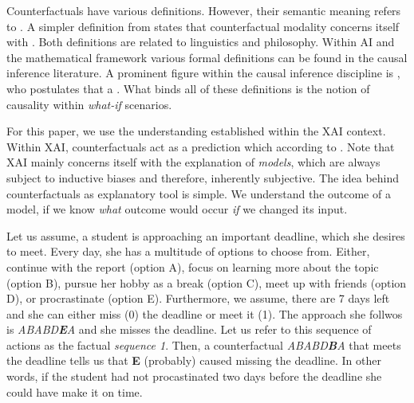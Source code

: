 \documentclass[./../../paper.tex]{subfiles}
\begin{document}
Counterfactuals have various definitions. However, their semantic meaning refers to \autocite{_counterfactual_}. A simpler definition from \citeauthor{starr_Counterfactuals_2021} states that counterfactual modality concerns itself with .
Both definitions are related to linguistics and philosophy. Within AI and the mathematical framework various formal definitions can be found in the causal inference\autocite{hitchcock_CausalModels_2020} literature. A prominent figure within the causal inference discipline is \citeauthor{pearl_Causalinferencestatistics_2016}, who postulates that a \autocite{pearl_Causalinferencestatistics_2016}. What binds all of these definitions is the notion of causality within \emph{what-if} scenarios.

For this paper, we use the understanding established within the \gls{XAI} context. Within \gls{XAI}, counterfactuals act as a prediction which  according to \citeauthor{molnar2019}\autocite[p. 212]{molnar2019}. Note that \gls{XAI} mainly concerns itself with the explanation of \emph{models}, which are always subject to inductive biases and therefore, inherently subjective. The idea behind counterfactuals as explanatory tool\footnotemark{} is simple. We understand the outcome of a model, if we know \emph{what} outcome would occur \emph{if} we changed its input. 

Let us assume, a student is approaching an important deadline, which she desires to meet. Every day, she has a multitude of options to choose from. Either, continue with the report (option A), focus on learning more about the topic (option B), pursue her hobby as a break (option C), meet up with friends (option D), or procrastinate (option E). Furthermore, we assume, there are 7 days left and she can either miss (0) the deadline or meet it (1). The approach she follwos is \textit{ABABD\textbf{E}A} and she misses the deadline. Let us refer to this sequence of actions as the factual \emph{sequence 1}. 
Then, a counterfactual \textit{ABABD\textbf{B}A} that meets the deadline tells us that \textbf{E} (probably) caused missing the deadline. In other words, if the student had not procastinated two days before the deadline she could have make it on time.
\end{document}
